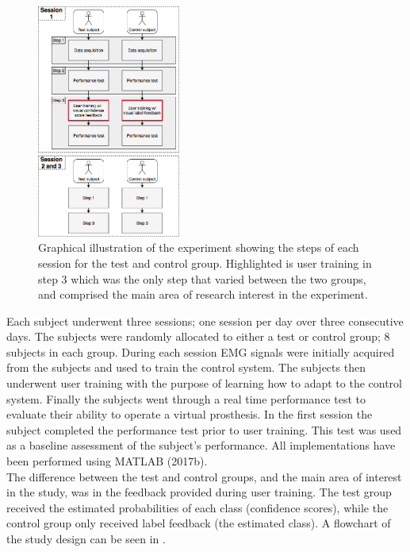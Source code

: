 

\begin{figure}[H]                                         
	\includegraphics[width=0.42\textwidth]{figures/Paper/Study_design}  
	\caption{Graphical illustration of the experiment showing the steps of each session for the test and control group. Highlighted is user training in step 3 which was the only step that varied between the two groups, and comprised the main area of research interest in the experiment.}
	\label{fig:P:std} 
\end{figure}
\vspace{-0.7cm}
Each subject underwent three sessions; one session per day over three consecutive days. The subjects were randomly allocated to either a test or control group; 8 subjects in each group. During each session EMG signals were initially acquired from the subjects and used to train the control system. The subjects then underwent user training with the purpose of learning how to adapt to the control system. Finally the subjects went through a real time performance test to evaluate their ability to operate a virtual prosthesis. In the first session the subject completed the performance test prior to user training. This test was used as a baseline assessment of the subject's performance. All implementations have been performed using MATLAB (2017b). \\
The difference between the test and control groups, and the main area of interest in the study, was in the feedback provided during user training. The test group received the estimated probabilities of each class (confidence scores), while the control group only received label feedback (the estimated class). A flowchart of the study design can be seen in .


